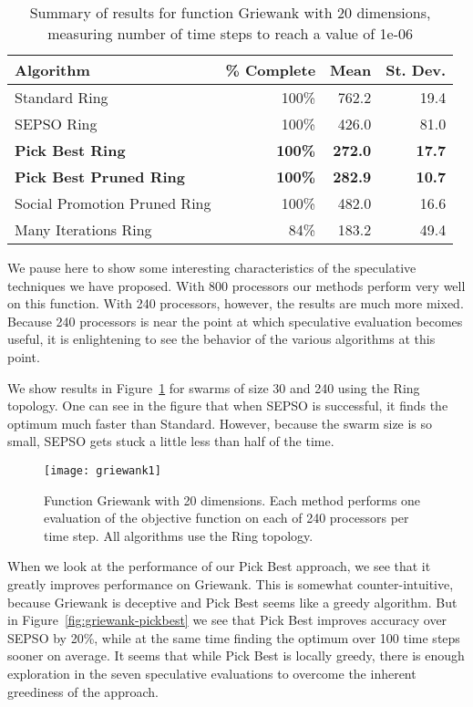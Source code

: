 \documentclass[smallcondensed]{svjour3}
\newcommand{\fig}[1]{Figure~\ref{fig:#1}}
\begin{document}
\begin{table}
  \caption{Summary of results for function Griewank with 20 dimensions,
  measuring number of time steps to reach a value of 1e-06}
  \label{tab:griewank-20}
  \centering
  \begin{tabular}{|l|r|r|r|}
  \hline
  Algorithm&\% Complete&Mean&St. Dev.\\
  \hline
  \hline
  Standard Ring&100\%&762.2&19.4\\
  \hline
  SEPSO Ring&100\%&426.0&81.0\\
  \hline
  \textbf{Pick Best Ring}&\textbf{100\%}&\textbf{272.0}&\textbf{17.7}\\
  \hline
  \textbf{Pick Best Pruned Ring}&\textbf{100\%}&\textbf{282.9}&\textbf{10.7}\\
  \hline
  Social Promotion Pruned Ring&100\%&482.0&16.6\\
  \hline
  Many Iterations Ring&84\%&183.2&49.4\\
  \hline
  \end{tabular}
\end{table}

We pause here to show some interesting characteristics of the speculative
techniques we have proposed.  With 800 processors our methods perform very well
on this function.  With 240 processors, however, the results are much more
mixed.  Because 240 processors is near the point at which speculative
evaluation becomes useful, it is enlightening to see the behavior of the
various algorithms at this point.

We show results in \fig{basic-griewank2} for swarms of size 30 and 240 using
the Ring topology.  One can see in the figure that when SEPSO is successful, it
finds the optimum much faster than Standard.  However, because the swarm size
is so small, SEPSO gets stuck a little less than half of the time.

\begin{figure}
  \centering
  \texttt{[image: griewank1]}
  \caption{Function Griewank with 20 dimensions.  Each method performs one
  evaluation of the objective function on each of 240 processors per time step.
  All algorithms use the Ring topology.}
  \label{fig:basic-griewank2}
\end{figure}

When we look at the performance of our Pick Best approach, we see that it
greatly improves performance on Griewank.  This is somewhat counter-intuitive,
because Griewank is deceptive and Pick Best seems like a greedy algorithm.  But
in \fig{griewank-pickbest} we see that Pick Best improves accuracy over SEPSO
by 20\%, while at the same time finding the optimum over 100 time steps sooner
on average.  It seems that while Pick Best is locally greedy, there is enough
exploration in the seven speculative evaluations to overcome the inherent
greediness of the approach.
\end{document}
